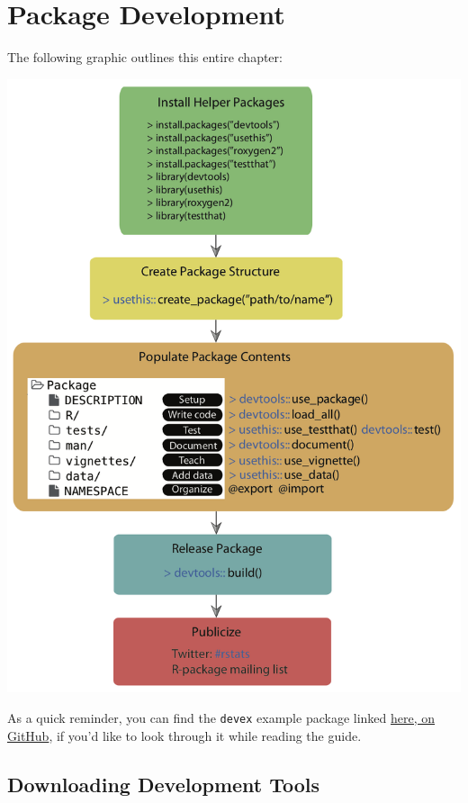 \documentclass[
]{book}
\begin{document}
\hypertarget{package-development}{%
\chapter{Package Development}\label{package-development}}

The following graphic outlines this entire chapter:

\includegraphics{images/package_workflow2.png}

As a quick reminder, you can find the \texttt{devex} example package linked \href{https://github.com/IQSS/Rbuild/tree/master/devex}{here, on GitHub}, if you'd like to look through it while reading the guide.

\hypertarget{downloading-development-tools}{%
\section{Downloading Development Tools}\label{downloading-development-tools}}
\end{document}
